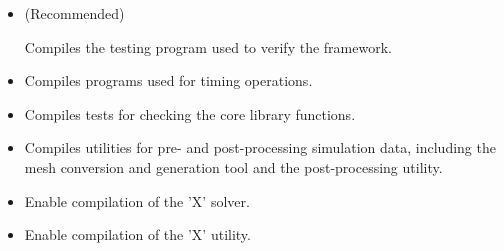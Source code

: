 \begin{itemize}
    \item {} (Recommended)

    Compiles the testing program used to verify the \nekpp framework.

    \item {}

    Compiles programs used for timing \nekpp operations.

    \item {}

    Compiles tests for checking the core library functions.

    \item {}

    Compiles utilities for pre- and post-processing simulation data, including the mesh conversion and generation tool  and the  post-processing utility.

    \item {}

    Enable compilation of the 'X' solver.
    
    \item {}
    
    Enable compilation of the 'X' utility. 
\end{itemize}


